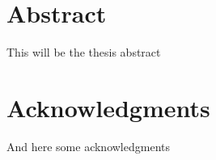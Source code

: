 \chapter*{Abstract}

This will be the thesis abstract

\chapter*{Acknowledgments}

And here some acknowledgments